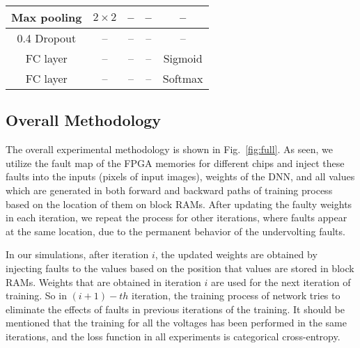 \documentclass[conference]{IEEEtran}
\begin{document}
\begin{table}[t]
\begin{tabular}{|c|c|c|c|c|}
Max pooling                                           & $2 \times 2$                                           & --     & --                                                        & --                                                            \\ \hline
0.4 Dropout                                           & --                                                     & --      & --                                                        & --                                                            \\ \hline
FC layer                                              & --                                                     & --     & --                                                        & Sigmoid                                                       \\ \hline
FC layer                                              & --                                                     & --     & --                                                        & Softmax                                    
\\ \hline
\end{tabular}
\end{table}



\color{black}



\subsection{Overall Methodology}
The overall experimental methodology is shown in Fig.~\ref{fig:full}. As seen, we utilize the fault map of the FPGA memories for different chips and inject these faults into the inputs (pixels of input images), weights of the DNN, and all values which are generated in both forward and backward paths of training process based on the location of them on block RAMs. After updating the faulty weights in each iteration, we repeat the process for other iterations, where faults appear at the same location, due to the permanent behavior of the undervolting faults. 


In our simulations, after iteration $i$, the updated weights are obtained by injecting faults to the values based on the position that values are stored in block RAMs. Weights that are obtained in iteration $i$ are used for the next iteration of training. So in $(i+1)-th$ iteration, the training process of network tries to eliminate the effects of faults in previous iterations of the training. It should be mentioned that the training for all the voltages has been performed in the same iterations, and the loss function in all experiments is categorical cross-entropy. 
 
\end{document}

